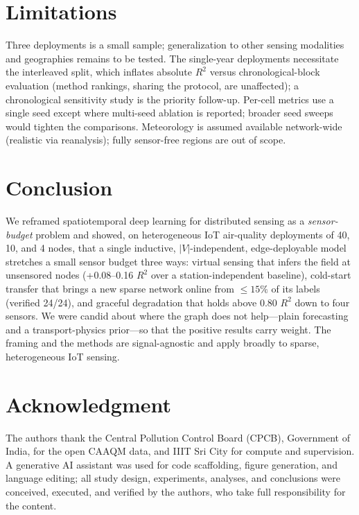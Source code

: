 \documentclass[journal]{IEEEtran}
\newcommand{\V}{\ensuremath{|V|}\xspace}
\newcommand{\Rtwo}{\ensuremath{R^{2}}\xspace}
\begin{document}
\section{Limitations}\label{sec:limitations}
Three deployments is a small sample; generalization to other sensing modalities and geographies remains to be tested. The single-year deployments necessitate the interleaved split, which inflates absolute \Rtwo versus chronological-block evaluation (method rankings, sharing the protocol, are unaffected); a chronological sensitivity study is the priority follow-up. Per-cell metrics use a single seed except where multi-seed ablation is reported; broader seed sweeps would tighten the comparisons. Meteorology is assumed available network-wide (realistic via reanalysis); fully sensor-free regions are out of scope.

\section{Conclusion}\label{sec:conclusion}
We reframed spatiotemporal deep learning for distributed sensing as a \emph{sensor-budget} problem and showed, on heterogeneous IoT air-quality deployments of 40, 10, and 4 nodes, that a single inductive, \V-independent, edge-deployable model stretches a small sensor budget three ways: virtual sensing that infers the field at unsensored nodes (+0.08--0.16 \Rtwo over a station-independent baseline), cold-start transfer that brings a new sparse network online from ${\le}15\%$ of its labels (verified 24/24), and graceful degradation that holds above 0.80 \Rtwo down to four sensors. We were candid about where the graph does not help---plain forecasting and a transport-physics prior---so that the positive results carry weight. The framing and the methods are signal-agnostic and apply broadly to sparse, heterogeneous IoT sensing.

\section*{Acknowledgment}
The authors thank the Central Pollution Control Board (CPCB), Government of India, for the open CAAQM data, and IIIT Sri City for compute and supervision. A generative AI assistant was used for code scaffolding, figure generation, and language editing; all study design, experiments, analyses, and conclusions were conceived, executed, and verified by the authors, who take full responsibility for the content.
\end{document}
